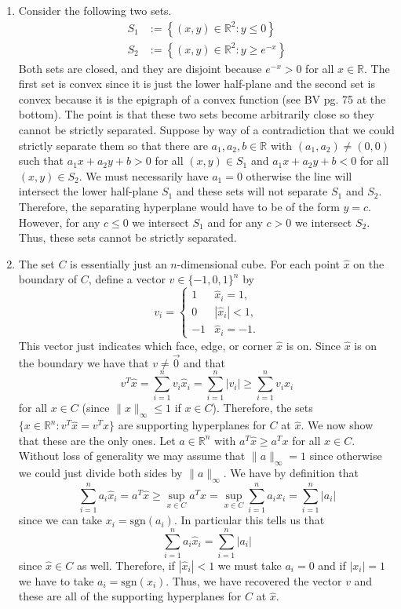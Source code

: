 \documentclass[11pt]{amsart}
\begin{document}
\begin{enumerate}
\item Consider the following two sets.
\begin{align*}
S_1 &:= \left\{ (x,y)\in \mathbb{R}^2 : y \le 0 \right\}\\
S_2 &:= \left\{ (x,y)\in \mathbb{R}^2 : y \ge e^{-x} \right\}
\end{align*}
Both sets are closed, and they are disjoint because $e^{-x} > 0$ for all $x\in \mathbb{R}$.  The first set is convex since it is just the lower half-plane and the second set is convex because it is the epigraph of a convex function (see BV pg. 75 at the bottom).  The point is that these two sets become arbitrarily close so they cannot be strictly separated.  Suppose by way of a contradiction that we could strictly separate them so that there are $a_1,a_2,b\in \mathbb{R}$ with $(a_1,a_2)\neq (0,0)$ such that $a_1x + a_2y + b > 0$ for all $(x,y)\in S_1$ and $a_1x + a_2y + b < 0$ for all $(x,y)\in S_2$.  We must necessarily have $a_1 = 0$ otherwise the line will intersect the lower half-plane $S_1$ and these sets will not separate $S_1$ and $S_2$.  Therefore, the separating hyperplane would have to be of the form $y = c$.  However, for any $c \le 0$ we intersect $S_1$ and for any $c > 0$ we intersect $S_2$.  Thus, these sets cannot be strictly separated.

\vspace{0.5in}

\item The set $C$ is essentially just an $n$-dimensional cube.  For each point $\hat{x}$ on the boundary of $C$, define a vector $v \in \{-1,0,1\}^n$ by 
\[
v_i = \begin{cases}
1 & \hat{x}_i = 1,\\
0 & |\hat{x}_i| < 1,\\
-1 & \hat{x}_i = -1.
\end{cases}
\]
This vector just indicates which face, edge, or corner $\hat{x}$ is on.  Since $\hat{x}$ is on the boundary we have that $v\neq \vec{0}$ and that
\[
v^T \hat{x}= \sum_{i=1}^n v_i \hat{x}_i = \sum_{i=1}^n |v_i| \ge \sum_{i=1}^n v_i x_i
\]
for all $x \in C$ (since $\|x\|_{\infty} \le 1$ if $x\in C$).  Therefore, the sets $\{x\in \mathbb{R}^n: v^T\hat{x} = v^Tx\}$ are supporting hyperplanes for $C$ at $\hat{x}$.  We now show that these are the only ones.  Let $a\in \mathbb{R}^n$ with $a^T\hat{x} \ge a^T x$ for all $x\in C$.  Without loss of generality we may assume that $\|a\|_{\infty} = 1$ since otherwise we could just divide both sides by $\|a\|_{\infty}$.  We have by definition that
\[
\sum_{i=1}^n a_i\hat{x}_i = a^T \hat{x} \ge \sup_{x\in C} a^Tx = \sup_{x\in C}\sum_{i=1}^n a_ix_i = \sum_{i=1}^n |a_i|
\]
since we can take $x_i = \mathrm{sgn}(a_i)$.  In particular this tells us that 
\[
\sum_{i=1}^n a_i\hat{x}_i =  \sum_{i=1}^n |a_i|
\]
since $\hat{x} \in C$ as well.  Therefore, if $|\hat{x}_i| < 1$ we must take $a_i = 0$ and if $|x_i| = 1$ we have to take $a_i = \mathrm{sgn}(x_i)$.  Thus, we have recovered the vector $v$ and these are all of the supporting hyperplanes for $C$ at $\hat{x}$.



\end{enumerate}
\end{document}
